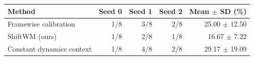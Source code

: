 \begin{tabular}{lrrrr}\toprule
Method & Seed 0 & Seed 1 & Seed 2 & Mean $\pm$ SD (\%)\\\midrule
Framewise calibration & 1/8 & 3/8 & 2/8 & 25.00 $\pm$ 12.50\\
ShiftWM (ours) & 1/8 & 2/8 & 1/8 & 16.67 $\pm$ 7.22\\
Constant dynamics context & 1/8 & 4/8 & 2/8 & 29.17 $\pm$ 19.09\\
\bottomrule\end{tabular}
